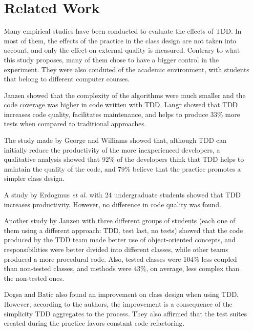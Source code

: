 \documentclass[times]{speauth}
\begin{document}
\section{Related Work}
\label{cap:trabalhos-relacionados}

Many empirical studies have been conducted to evaluate the effects of TDD.
In most of them, the effects of the practice in the class design are not taken
into account, and only the effect on external quality is measured.
Contrary to what this study proposes, many of them chose
to have a bigger control in the experiment. They were also conduted of the academic
environment, with students that belong to different computer courses.

Janzen \cite{janzen-arch-improvement} showed that the complexity of the algorithms
were much smaller and the code coverage was higher in code written with TDD.
Langr \cite{langr} showed that TDD increases code quality, facilitates
maintenance, and helps to produce 33\% more tests when compared to traditional
approaches.

The study made by George and Williams \cite{george-e-williams} showed that,
although TDD can initially reduce the productivity of the more inexperienced
developers, a qualitative analysis showed that 92\% of the developers think
that TDD helps to maintain the quality of the code, and 79\% believe that
the practice promotes a simpler class design.

A study by Erdogmus \textit{et al.} \cite{erdogmus-morisio} with 24 undergraduate students
showed that TDD increases productivity. However, no difference in code quality
was found.

Another study by Janzen \cite{janzen-saiedian} with three different groups
of students (each one of them using a different approach: TDD, test last, no tests)
showed that the code produced by the TDD team made better use of object-oriented
concepts, and responsibilities were better divided into different classes,
while other teams produced a more procedural code. Also, tested classes were
104\% less coupled than non-tested classes, and methods were 43\%, on average, less complex
than the non-tested ones.

Dogsa and Batic \cite{dogsa-batic} also found an improvement on class design when
using TDD. However, according to the authors, the improvement is a consequence of the simplicity
TDD aggregates to the process. They also affirmed that the test suites created during
the practice favors constant code refactoring.
\end{document}
